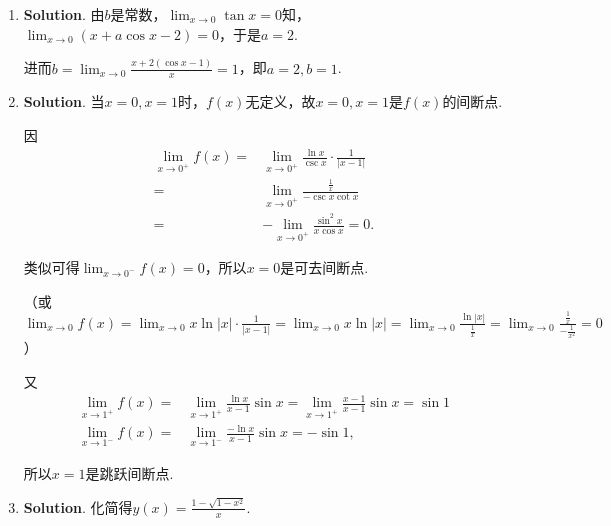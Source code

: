 \documentclass[../Main.tex]{subfiles}
\begin{document}
\begin{enumerate}
          因
          \[
              \begin{aligned}
                  \lim_{x\to0}\frac{(x-\arctan x)'}{(cx^r)'}= & \frac{1-\frac{1}{1+x^2}}{crx^{r-1}} \\
                  =                                           & \lim_{x\to0}\frac{1}{crx^{r-3}},
              \end{aligned}
          \]

          所以$\lim_{x\to0}\frac{1}{crx^{r-3}}=1$，从而$r=3,c=\frac{1}{3}$，即主部为$\frac{1}{3}
              x^{3}$，阶数为$3$.

    \item \textbf{Solution}. 由$b$是常数，$\lim_{x\to0}\tan x=0$知，$\lim_{x\to0}
              (x+a\cos x-2)=0$，于是$a=2$.

          进而$b=\lim_{x\to0}\frac{x+2(\cos x-1)}{x}=1$，即$a=2,b=1$.

    \item \textbf{Solution}. 当$x=0,x=1$时，$f(x)$无定义，故$x=0,x=1$是$f(x)$的间断点.

          因
          \[
              \begin{aligned}
                  \lim_{x\to0^+}f(x)= & \lim_{x\to0^+}\frac{\ln x}{\csc x}\cdot\frac{1}{|x-1|} \\
                  =                   & \lim_{x\to0^+}\frac{\frac{1}{x}}{-\csc x\cot x}        \\
                  =                   & -\lim_{x\to0^+}\frac{\sin ^2 x}{x\cos x}=0.
              \end{aligned}
          \]

          类似可得$\lim_{x\to0^-}f(x)=0$，所以$x=0$是可去间断点.

          （或$\lim_{x\to0}f(x)=\lim_{x\to0}x\ln|x|\cdot\frac{1}{|x-1|}=\lim_{x\to 0}
              x\ln|x|=\lim_{x\to0}\frac{\ln|x|}{\frac{1}{x}}=\lim_{x\to0}\frac{\frac{1}{x}}{-\frac{1}{x^{2}}}
              =0$）

          又
          \[
              \begin{aligned}
                  \lim_{x\to1^+}f(x)= & \lim_{x\to1^+}\frac{\ln x}{x-1}\sin x=\lim_{x\to1^+}\frac{x-1}{x-1}\sin x=\sin 1 \\
                  \lim_{x\to1^-}f(x)= & \lim_{x\to1^-}\frac{-\ln x}{x-1}\sin x=-\sin 1,
              \end{aligned}
          \]

          所以$x=1$是跳跃间断点.

    \item \textbf{Solution}. 化简得$y(x)=\frac{1-\sqrt{1-x^{2}}}{x}$.


\end{enumerate}
\end{document}
